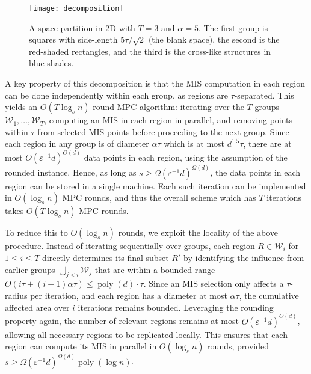 \documentclass[11pt,letterpaper]{article}
\theoremstyle{plain}
\theoremstyle{definition}
\theoremstyle{remark}
\DeclareMathOperator{\poly}{poly}
\begin{document}
\begin{figure}[ht]
    \centering
    \texttt{[image: decomposition]}
    \caption{A space partition in 2D with $T = 3$ and $\alpha = 5$.
    The first group is squares with side-length $5\tau/\sqrt{2}$ (the blank space), the second is the red-shaded rectangles, and the third is the cross-like structures in blue shades.}
    \label{fig:decomposition}
\end{figure}

A key property of this decomposition is that the MIS computation in each region can be done independently within each group, as regions are $\tau$-separated.
This yields an $O(T\log_{s}n)$-round MPC algorithm: iterating over the $T$ groups $\mathcal{W}_{1}, \ldots, \mathcal{W}_{T}$, computing an MIS in each region in parallel, and removing points within $\tau$ from selected MIS points before proceeding to the next group.
Since each region in any group is of diameter $\alpha\tau$ which is at most $d^{1.5}\tau$,
there are at most $O(\varepsilon^{-1}d)^{O(d)}$ data points in each region, using the assumption of the rounded instance.
Hence, as long as $s \geq \Omega(\varepsilon^{-1}d)^{\Omega(d)}$,
the data points in each region can be stored in a single machine. Each such iteration can be implemented in $O(\log_s n)$ MPC rounds, and thus the overall scheme which has $T$ iterations takes $O(T\log_s n)$ MPC rounds.

To reduce this to $O(\log_{s} n)$ rounds, we exploit the locality of the above procedure.
Instead of iterating sequentially over groups, each region $R\in \mathcal{W}_{i}$ for $1\leq i\leq T$  directly determines its final subset $R'$ by identifying the influence from earlier groups $\bigcup_{j<i}\mathcal{W}_{j}$ that are within a bounded range $O(i\tau + (i-1)\alpha\tau)\leq \poly(d)\cdot \tau$.
Since an MIS selection only affects a $\tau$-radius per iteration, and each region has a diameter at most $\alpha\tau$, the cumulative affected area over $i$ iterations remains bounded. Leveraging the rounding property again, the number of relevant regions remains at most $O(\varepsilon^{-1}d)^{O(d)}$, allowing all necessary regions to be replicated locally.
This ensures that each region can compute its MIS in parallel in $O(\log_{s}n)$ rounds, provided $s\geq \Omega(\varepsilon^{-1}d)^{\Omega(d)}\poly(\log n)$.
\end{document}
